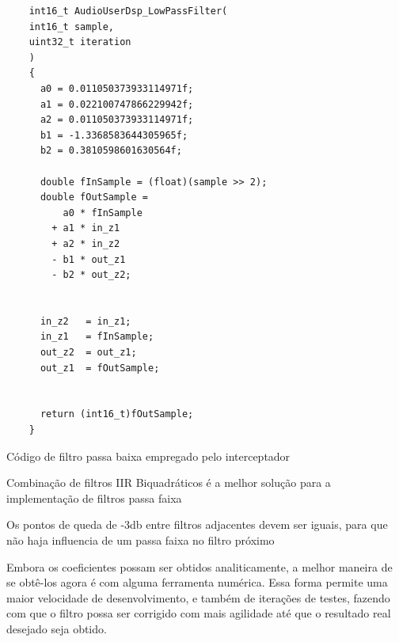 \begin{sourcecode}[!ht]
\centering
\begin{verbatim}
    int16_t AudioUserDsp_LowPassFilter(
    int16_t sample, 
    uint32_t iteration
    )
    {
      a0 = 0.011050373933114971f;
      a1 = 0.022100747866229942f;
      a2 = 0.011050373933114971f;
      b1 = -1.3368583644305965f;
      b2 = 0.3810598601630564f;
    
      double fInSample = (float)(sample >> 2);
      double fOutSample = 
          a0 * fInSample 
        + a1 * in_z1 
        + a2 * in_z2
        - b1 * out_z1
        - b2 * out_z2;
    
    
      in_z2   = in_z1;
      in_z1   = fInSample;
      out_z2  = out_z1;
      out_z1  = fOutSample;
    
    
      return (int16_t)fOutSample;
    }

\end{verbatim}
\caption{Código de filtro passa baixa empregado pelo interceptador}\label{code:CML}
\end{sourcecode}

\color{orange}
Combinação de filtros IIR Biquadráticos é a melhor solução para a implementação de filtros passa faixa

Os pontos de queda de -3db entre filtros adjacentes devem ser iguais, para que não haja influencia de um passa faixa no filtro próximo

Embora os coeficientes possam ser obtidos analiticamente, a melhor maneira de se obtê-los agora é com alguma ferramenta numérica. Essa forma permite uma maior velocidade de desenvolvimento, e também de iterações de testes, fazendo com que o filtro possa ser corrigido com mais agilidade até que o resultado real desejado seja obtido.
\color{black}

    
    
    
    
    
